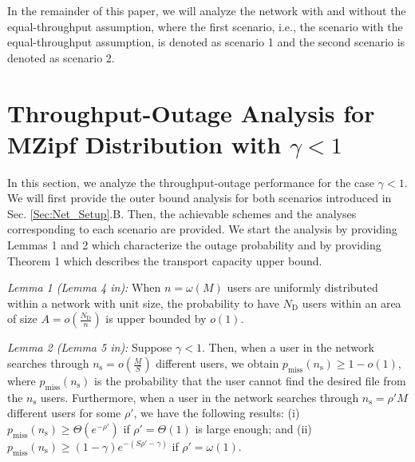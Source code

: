 \documentclass[journal,draftclsnofoot,onecolumn,12pt,twoside]{IEEEtran}
\begin{document}
In the remainder of this paper, we will analyze the network with and without the equal-throughput assumption, where the first scenario, i.e., the scenario with the equal-throughput assumption, is denoted as scenario 1 and the second scenario is denoted as scenario 2.

\section{Throughput-Outage Analysis for MZipf Distribution with $\gamma<1$}

\label{Sec:Out_Bound_Gen}

In this section, we analyze the throughput-outage performance for the case $\gamma<1$. We will first provide the outer bound analysis for both scenarios introduced in Sec. \ref{Sec:Net_Setup}.B. Then, the achievable schemes and the analyses corresponding to each scenario are provided. We start the analysis by providing Lemmas 1 and 2 which characterize the outage probability and by providing Theorem 1 which describes the transport capacity upper bound.

{\em Lemma 1 (Lemma 4 in\cite{lee2020optimal}):} When $n=\omega(M)$ users are uniformly distributed within a network with unit size, the probability to have $N_{\text{D}}$ users within an area of size $A=o\left(\frac{N_{\text{D}}}{n}\right)$ is upper bounded by $o(1)$.

{\em Lemma 2 (Lemma 5 in\cite{lee2020optimal}):} Suppose $\gamma<1$. Then, when a user in the network searches through $n_{\text{s}}=o\left(\frac{M}{S}\right)$ different users, we obtain $p_{\text{miss}}(n_{\text{s}})\geq 1-o(1)$, where $p_{\text{miss}}(n_{\text{s}})$ is the probability that the user cannot find the desired file from the $n_{\text{s}}$ users. Furthermore, when a user in the network searches through $n_{\text{s}}=\rho' M$ different users for some $\rho'$, we have the following results: (i) $p_{\text{miss}}(n_{\text{s}})\geq \Theta\left(e^{-\rho'}\right)$ if $\rho'=\Theta(1)$ is large enough; and (ii) $p_{\text{miss}}(n_{\text{s}})\geq (1-\gamma)e^{-(S\rho'-\gamma)}$ if $\rho'=\omega(1)$.
\end{document}
